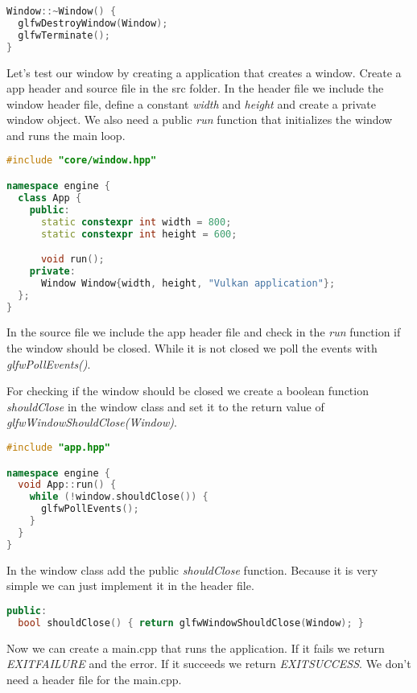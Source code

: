 \documentclass[12pt]{report} \usepackage{preamble}
\begin{document}
\begin{lstlisting}[language=C++]
Window::~Window() {
  glfwDestroyWindow(Window);
  glfwTerminate();
}
\end{lstlisting}

Let's test our window by creating a application that creates a window.
Create a app header and source file in the src folder. In the header file we include the window header file,
define a constant \textit{width} and \textit{height} and create a private window object.
We also need a public \textit{run} function that initializes the window and runs the main loop.

\newpage

\begin{lstlisting}[language=C++]
#include "core/window.hpp"

namespace engine {
  class App {
    public:
      static constexpr int width = 800;
      static constexpr int height = 600;

      void run();
    private:
      Window Window{width, height, "Vulkan application"};
  };
}
\end{lstlisting}

In the source file we include the app header file and check in the \textit{run} function if the window
should be closed. While it is not closed we poll the events with \textit{glfwPollEvents()}.

For checking if the window should be closed we create a boolean function \textit{shouldClose} in the
window class and set it to the return value of \textit{glfwWindowShouldClose(Window)}.

\begin{lstlisting}[language=C++]
#include "app.hpp"

namespace engine {
  void App::run() {
    while (!window.shouldClose()) {
      glfwPollEvents();
    }
  }
} 
\end{lstlisting}

In the window class add the public \textit{shouldClose} function.
Because it is very simple we can just implement it in the header file.

\begin{lstlisting}[language=C++]
public:
  bool shouldClose() { return glfwWindowShouldClose(Window); }
\end{lstlisting}

Now we can create a main.cpp that runs the application.
If it fails we return \\ \textit{EXIT\textunderscore FAILURE} and the error.
If it succeeds we return \textit{EXIT\textunderscore SUCCESS}.
We don't need a header file for the main.cpp.
\end{document}
